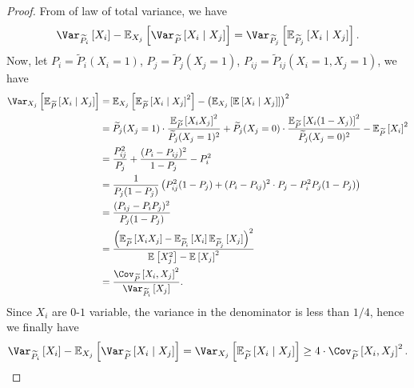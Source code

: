 \begin{proof}
	From of law of total variance, we have
	\[
		\Var_{\widetilde{P} _i}\left[X_i \right]  - \mathbb{E}_{X_j}\left[\Var_{\widetilde{P} }\left[X_i \mid X_j \right]  \right] = \Var_{\widetilde{P} _{j}}\left[\mathbb{E}_{\widetilde{P} _j}\left[X_i \mid X_j \right]  \right] .
	\]
	Now, let \(P_i = \widetilde{P} _i(X_i = 1)\), \(P_j= \widetilde{P} _j(X_j = 1)\), \(P_{ij}= \widetilde{P} _{ij}(X_i=1, X_j=1) \), we have
	\[
		\begin{split}
			\Var_{X_j}\left[\mathbb{E}_{\widetilde{P} }\left[X_i \mid X_j \right] \right]
			&= \mathbb{E}_{X_j}\left[\mathbb{E}_{\widetilde{P} }\left[X_i \mid X_j \right] ^{2} \right] - \left( \mathbb{E}_{X_j}\left[ \mathbb{E}_{}\left[X_i\mid X_j \right] \right]  \right)^{2} \\
			&=\widetilde{P} _j(X_j = 1)\cdot \frac{\mathbb{E}_{\widetilde{P} }\left[X_i X_j \right]^{2}}{\widetilde{P} _j(X_j = 1)^{2}} + \widetilde{P} _j(X_j = 0)\cdot \frac{\mathbb{E}_{\widetilde{P} }\left[X_i (1-X_j) \right]^{2}}{\widetilde{P} _j(X_j = 0)^{2}} - \mathbb{E}_{\widetilde{P} }\left[ X_i\right] ^{2} \\
			&=\frac{P_{ij} ^{2} }{P_j} + \frac{(P_i - P_{ij} )^{2} }{1-P_j}- P_i ^{2} \\
			&=\frac{1}{P_j(1-P_j)} \left( P_{ij}^{2} (1-P_j) + (P_i - P_{ij} )^{2} \cdot P_j - P_i ^{2} P_j(1-P_j)  \right)\\
			&= \frac{(P_{ij} - P_i P_j)^{2} }{P_j(1-P_j)}\\
			&= \frac{\left( \mathbb{E}_{\widetilde{P} }\left[ X_i X_j\right] - \mathbb{E}_{\widetilde{P} _i}\left[ X_i\right] \mathbb{E}_{\widetilde{P} _j}\left[X_j \right] \right) ^{2} }{\mathbb{E}_{}\left[X_j^2 \right] - \mathbb{E}_{}\left[X_j \right] ^{2} }\\
			&= \frac{\Cov_{\widetilde{P} }\left[X_i, X_j \right]^{2}  }{\Var_{\widetilde{P} _i}\left[X_j \right] }.
		\end{split}
	\]
	Since \(X_i\) are \(0\)-\(1\) variable, the variance in the denominator is less than \(1 / 4\), hence we finally have
	\[
		\Var_{\widetilde{P} _i}\left[X_i \right]  - \mathbb{E}_{X_j}\left[\Var_{\widetilde{P} }\left[X_i \mid X_j \right]  \right] = \Var_{X_j}\left[ \mathbb{E}_{\widetilde{P} }\left[X_i \mid X_j \right] \right] \geq 4\cdot \Cov_{\widetilde{P} }\left[X_i, X_j \right]^{2} .
	\]
\end{proof}

